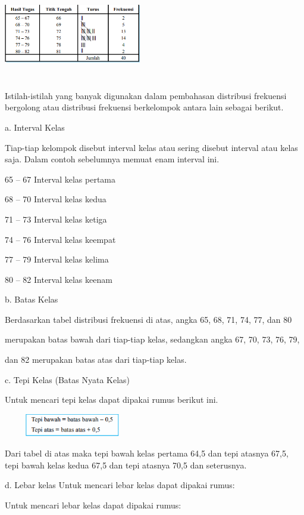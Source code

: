 \documentclass[11pt,fleqn]{book} %
\begin{document}
{\includegraphics[width = 6cm, height= 4cm]{Pictures/2reska.png}

Istilah-istilah yang banyak digunakan dalam pembahasan distribusi frekuensi
bergolong atau distribusi frekuensi berkelompok antara lain sebagai berikut.



a. Interval Kelas

Tiap-tiap kelompok disebut interval kelas atau sering disebut interval atau kelas
saja. Dalam contoh sebelumnya memuat enam interval ini.

65 – 67 Interval kelas pertama

68 – 70 Interval kelas kedua

71 – 73 Interval kelas ketiga

74 – 76 Interval kelas keempat

77 – 79 Interval kelas kelima

80 – 82 Interval kelas keenam


b. Batas Kelas

Berdasarkan tabel distribusi frekuensi di atas, angka 65, 68, 71, 74, 77, dan 80

merupakan batas bawah dari tiap-tiap kelas, sedangkan angka 67, 70, 73, 76, 79,

dan 82 merupakan batas atas dari tiap-tiap kelas.


c. Tepi Kelas (Batas Nyata Kelas)

Untuk mencari tepi kelas dapat dipakai rumus berikut ini.

\includegraphics[width = 6cm, height= 1cm]{Pictures/3reska.png}

Dari tabel di atas maka tepi bawah kelas pertama 64,5 dan tepi atasnya 67,5, tepi
bawah kelas kedua 67,5 dan tepi atasnya 70,5 dan seterusnya.

d. Lebar kelas
Untuk mencari lebar kelas dapat dipakai rumus:

Untuk mencari lebar kelas dapat dipakai rumus:

}
\end{document}
